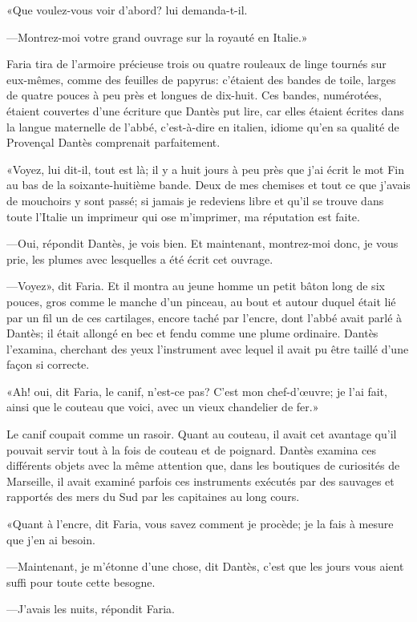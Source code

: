 «Que voulez-vous voir d'abord? lui demanda-t-il.

—Montrez-moi votre grand ouvrage sur la royauté en Italie.»

Faria tira de l'armoire précieuse trois ou quatre rouleaux de linge tournés sur eux-mêmes, comme des feuilles de papyrus: c'étaient des bandes de toile, larges de quatre pouces à peu près et longues de dix-huit. Ces bandes, numérotées, étaient couvertes d'une écriture que Dantès put lire, car elles étaient écrites dans la langue maternelle de l'abbé, c'est-à-dire en italien, idiome qu'en sa qualité de Provençal Dantès comprenait parfaitement.

«Voyez, lui dit-il, tout est là; il y a huit jours à peu près que j'ai écrit le mot Fin au bas de la soixante-huitième bande. Deux de mes chemises et tout ce que j'avais de mouchoirs y sont passé; si jamais je redeviens libre et qu'il se trouve dans toute l'Italie un imprimeur qui ose m'imprimer, ma réputation est faite.

—Oui, répondit Dantès, je vois bien. Et maintenant, montrez-moi donc, je vous prie, les plumes avec lesquelles a été écrit cet ouvrage.

—Voyez», dit Faria. Et il montra au jeune homme un petit bâton long de six pouces, gros comme le manche d'un pinceau, au bout et autour duquel était lié par un fil un de ces cartilages, encore taché par l'encre, dont l'abbé avait parlé à Dantès; il était allongé en bec et fendu comme une plume ordinaire. Dantès l'examina, cherchant des yeux l'instrument avec lequel il avait pu être taillé d'une façon si correcte.

«Ah! oui, dit Faria, le canif, n'est-ce pas? C'est mon chef-d'œuvre; je l'ai fait, ainsi que le couteau que voici, avec un vieux chandelier de fer.»

Le canif coupait comme un rasoir. Quant au couteau, il avait cet avantage qu'il pouvait servir tout à la fois de couteau et de poignard. Dantès examina ces différents objets avec la même attention que, dans les boutiques de curiosités de Marseille, il avait examiné parfois ces instruments exécutés par des sauvages et rapportés des mers du Sud par les capitaines au long cours.

«Quant à l'encre, dit Faria, vous savez comment je procède; je la fais à mesure que j'en ai besoin.

—Maintenant, je m'étonne d'une chose, dit Dantès, c'est que les jours vous aient suffi pour toute cette besogne.

—J'avais les nuits, répondit Faria.

